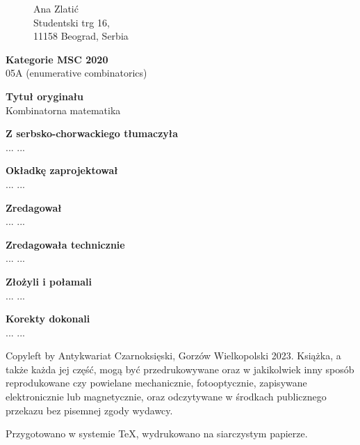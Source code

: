 

\thispagestyle{empty}
\begin{figure}[H]
\begin{minipage}[b]{.48\linewidth}
{\noindent Ana Zlatić\\
Studentski trg 16,\\
11158 Beograd, Serbia}
\end{minipage}
\end{figure}

{\noindent \textbf{Kategorie MSC 2020}\\05A (enumerative combinatorics)} \vspace{5mm}

{\noindent \textbf{Tytuł oryginału}\\Kombinatorna matematika}
\vspace{5mm}

{\noindent \textbf{Z serbsko-chorwackiego tłumaczyła}\\... ...} 
\vspace{5mm}

{\noindent \textbf{Okładkę zaprojektował}\\... ...}
\vspace{5mm}

{\noindent \textbf{Zredagował}\\... ...}
\vspace{5mm}

{\noindent \textbf{Zredagowała technicznie}\\... ...}
\vspace{5mm}

{\noindent \textbf{Złożyli i połamali}\\... ...}
\vspace{5mm}

{\noindent \textbf{Korekty dokonali}\\... ...}

\vfill

{\noindent Copyleft by Antykwariat Czarnoksięski, Gorzów Wielkopolski 2023.
Książka, a także każda jej część, mogą być przedrukowywane oraz w jakikolwiek inny sposób reprodukowane czy powielane mechanicznie, fotooptycznie, zapisywane elektronicznie lub magnetycznie, oraz odczytywane w środkach publicznego przekazu bez pisemnej zgody wydawcy.}

\vspace{5mm}

{\noindent Przygotowano w systemie \TeX, wydrukowano na siarczystym papierze.}


